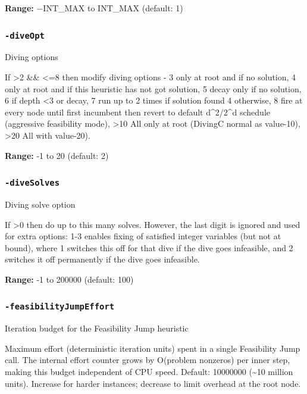 \documentclass[11pt,a4paper]{article}
\begin{document}
\textbf{Range:} $-$INT\_MAX to INT\_MAX (default: 1)

\subsubsection*{\texttt{-diveOpt}}

Diving options

If >2 \&\& <=8 then modify diving options -	 
	3 only at root and if no solution,	 
	4 only at root and if this heuristic has not got solution,	 
	5 decay only if no solution,	 
	6 if depth <3 or decay,	 
	7 run up to 2 times if solution found 4 otherwise,	 
	8 fire at every node until first incumbent then revert to default d\textasciicircum{}2/2\textasciicircum{}d schedule (aggressive feasibility mode),	 
	>10 All only at root (DivingC normal as value-10),	 
	>20 All with value-20).

\textbf{Range:} -1 to 20 (default: 2)

\subsubsection*{\texttt{-diveSolves}}

Diving solve option

If >0 then do up to this many solves. However, the last digit is ignored and used for extra options: 1-3 enables fixing of satisfied integer variables (but not at bound), where 1 switches this off for that dive if the dive goes infeasible, and 2 switches it off permanently if the dive goes infeasible.

\textbf{Range:} -1 to 200000 (default: 100)

\subsubsection*{\texttt{-feasibilityJumpEffort}}

Iteration budget for the Feasibility Jump heuristic

Maximum effort (deterministic iteration units) spent in a single Feasibility Jump call. The internal effort counter grows by O(problem nonzeros) per inner step, making this budget independent of CPU speed. Default: 10000000 (\textasciitilde{}10 million units). Increase for harder instances; decrease to limit overhead at the root node.
\end{document}
